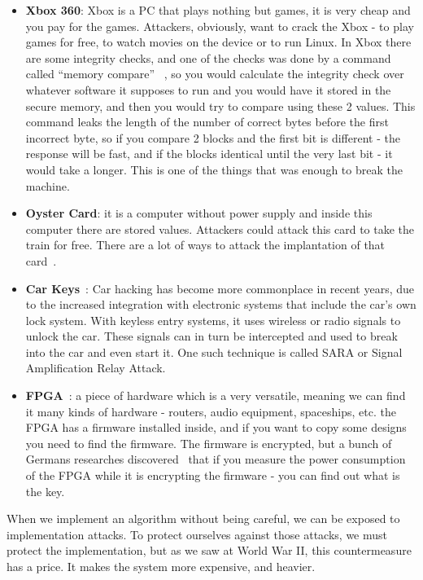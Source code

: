 \begin{itemize}
    \item \textbf{Xbox 360}: Xbox is a PC that plays nothing but games, it is
    very cheap and you pay for the games. Attackers, obviously, want to crack
    the Xbox - to play games for free, to watch movies on the device or to run
    Linux. In Xbox there are some integrity checks, and one of the checks was
    done by a command called ``memory compare'' ~\cite{memcmp}, so you would
    calculate the integrity check over whatever software it supposes to run and
    you would have it stored in the secure memory, and then you would try to
    compare using these 2 values. This command leaks the length of the number of
    correct bytes before the first incorrect byte, so if you compare 2 blocks
    and the first bit is different - the response will be fast, and if the
    blocks identical until the very last bit - it would take a longer. This is
    one of the things that was enough to break the machine. 
    \item \textbf{Oyster Card}: it is a computer without power supply and inside
    this computer there are stored values. Attackers could attack this card to
    take the train for free. There are a lot of ways to attack the implantation
    of that card~\cite{garcia2008dismantling, courtois2008algebraic}.
    \item \textbf{Car Keys}~: Car hacking has become more commonplace in recent years, due to the increased integration with electronic systems that include the car’s own lock system.
    With keyless entry systems, it uses wireless or radio signals to unlock the car.
    These signals can in turn be intercepted and used to break into the car and even start it.
    One such technique is called SARA or Signal Amplification Relay Attack. \cite{relayAttack}
    \item \textbf{FPGA}~\cite{fpga}: a piece of hardware which is a very
    versatile, meaning we can find it many kinds of hardware - routers, audio
    equipment, spaceships, etc. the FPGA has a firmware installed inside, and if
    you want to copy some designs you need to find the firmware. The firmware is
    encrypted, but a bunch of Germans researches
    discovered~\cite{moradi2011vulnerability} that if you measure the power
    consumption of the FPGA while it is encrypting the firmware - you can find
    out what is the key.
\end{itemize}

When we implement an algorithm without being careful, we can be exposed to
implementation attacks. To protect ourselves against those attacks, we must protect the implementation, but as we saw at World War II, this countermeasure has a price. It makes the system more expensive, and heavier.

